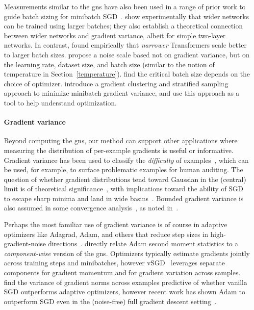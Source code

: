 \documentclass{article}
\begin{document}
Measurements similar to the \ac{gns} have also been used in a range of
prior work to guide batch sizing for minibatch
SGD~\citep{byrd2012sample,de2016big,balles2016coupling,yin2018gradient}.
\citet{chen2018effect} show experimentally that wider networks can be
trained using larger batches; they also establish a theoretical
connection between wider networks and gradient variance, albeit for
simple two-layer networks.  In contrast, \citet{shallue2019measuring}
found empirically that \emph{narrower} Transformers scale better to
larger batch sizes.
\citet{smith2017bayesian} propose a noise scale based not on gradient
variance, but on the learning rate, dataset size, and batch size (similar to the notion of temperature in Section~\ref{temperature}).
\citet{zhang2019algorithmic} find the critical batch size depends on
the choice of optimizer.
\citet{faghri2020study} introduce a gradient clustering and stratified
sampling approach to minimize minibatch gradient variance, and use
this approach as a tool to help understand optimization.

\paragraph{Gradient variance}


Beyond computing the \ac{gns}, our method can support other
applications where measuring the distribution of per-example gradients
is useful or informative.
Gradient variance has been used to classify the \emph{difficulty} of
examples~\citep{agarwal2022estimating}, which can be used, for
example, to surface problematic examples for human auditing.
The question of whether gradient distributions tend toward Gaussian in
the (central) limit is of theoretical
significance~\citep{smith2017bayesian}, with implications toward the
ability of SGD to escape sharp minima and land in wide
basins~\citep{zhu2018anisotropic,nguyen2019first,simsekli2019tail}.
Bounded gradient variance is also assumed in some convergence
analysis~\citep{bottou2018optimization,zhang2022adam}, as noted
in~\citep{faghri2020study}.

Perhaps the most familiar use of gradient variance is of course in
adaptive optimizers like Adagrad, Adam, and others that reduce step
sizes in high-gradient-noise
directions~\citep{duchi2011adaptive,zeiler2012adadelta,schaul2013no,kingma2014adam,reddi2019convergence}.
\citet[App.~C]{hilton2022batch} directly relate Adam second moment statistics
to a \emph{component-wise} version of the \ac{gns}.
Optimizers typically estimate gradients jointly across training steps
and minibatches, however vSGD~\citep{schaul2013no} leverages separate
components for gradient momentum and for gradient variation across
samples.
\citet{zhang2020adaptive} find the variance of gradient norms across
examples predictive of whether vanilla SGD outperforms adaptive
optimizers, however recent work has shown
Adam to outperform SGD even in the (noise-free) full gradient descent
setting~\cite{kunstner2023noise,kunstner2024heavy}.
\end{document}

